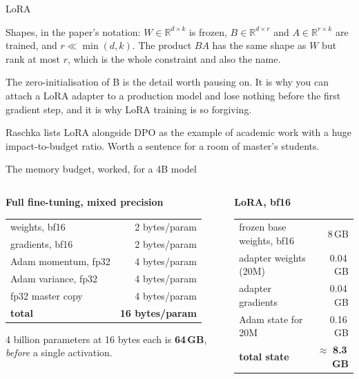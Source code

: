\documentclass[aspectratio=169,10pt]{beamer}
\begin{document}
\begin{frame}[shrink=6]{LoRA}
{  Shapes, in the paper's notation: $W \in \mathbb{R}^{d\times k}$ is
  frozen, $B \in \mathbb{R}^{d\times r}$ and $A \in \mathbb{R}^{r\times k}$ are
  trained, and $r \ll \min(d,k)$. The product $BA$ has the same shape as $W$
  but rank at most $r$, which is the whole constraint and also the name.

  The zero-initialisation of B is the detail worth pausing on. It is why
  you can attach a LoRA adapter to a production model and lose nothing before
  the first gradient step, and it is why LoRA training is so forgiving.

  Raschka lists LoRA alongside DPO as the example of academic work with a huge
  impact-to-budget ratio. Worth a sentence for a room of master's students.}
\end{frame}

\begin{frame}{The memory budget, worked, for a 4B model}
  \begin{columns}[T]
    \begin{column}{0.5\textwidth}
      \textbf{Full fine-tuning, mixed precision}
      \vspace{0.3em}
      \centering
      \small
      \begin{tabular}{@{}L{3.0cm} r@{}}
        \toprule
        weights, bf16 & 2 bytes/param\\
        gradients, bf16 & 2 bytes/param\\
        Adam momentum, fp32 & 4 bytes/param\\
        Adam variance, fp32 & 4 bytes/param\\
        fp32 master copy & 4 bytes/param\\
        \midrule
        \textbf{total} & \textbf{16 bytes/param}\\
        \bottomrule
      \end{tabular}
      \vspace{0.5em}

      \raggedright
      4 billion parameters at 16 bytes each is \textbf{64\,GB},
      \emph{before} a single activation.
    \end{column}
    \begin{column}{0.5\textwidth}
      \textbf{LoRA, bf16}
      \vspace{0.3em}
      \centering
      \small
      \begin{tabular}{@{}L{4.2cm} r@{}}
        \toprule
        frozen base weights, bf16 & 8\,GB\\
        adapter weights (20M) & 0.04\,GB\\
        adapter gradients & 0.04\,GB\\
        Adam state for 20M & 0.16\,GB\\
        \midrule
        \textbf{total state} & $\approx$ \textbf{8.3\,GB}\\
        \bottomrule
      \end{tabular}
      \vspace{0.5em}


\end{column}
\end{columns}
\end{frame}
\end{document}

